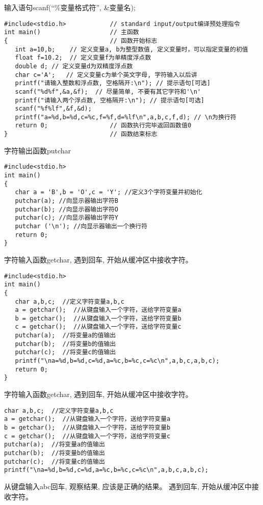 \begin{frame}[fragile]{输入语句scanf(``\%变量格式符'', \&变量名);}
\begin{lstlisting}
#include<stdio.h>            // standard input/output编译预处理指令
int main()                   // 主函数
{                            // 函数开始标志
   int a=10,b;    // 定义变量a, b为整型数值, 定义变量时，可以指定变量的初值
   float f=10.2;  // 定义变量f为单精度浮点数
   double d; // 定义变量d为双精度浮点数
   char c='A';   // 定义变量c为单个英文字母, 字符输入以后讲
   printf("请输入整数和浮点数, 空格隔开:\n"); // 提示语句[可选]
   scanf("%d%f",&a,&f);  // 尽量简单, 不要有其它字符和'\n'
   printf("请输入两个浮点数, 空格隔开:\n"); // 提示语句[可选]
   scanf("%f%lf",&f,&d);
   printf("a=%d,b=%d,c=%c,f=%f,d=%lf\n",a,b,c,f,d); // \n为换行符
   return 0;                 // 函数执行完毕返回函数值0
}                            // 函数结束标志
\end{lstlisting}
\end{frame}

\begin{frame}[fragile]{字符输出函数putchar}
\begin{lstlisting}
#include<stdio.h>
int main()
{
   char a = 'B',b = 'O',c = 'Y'; //定义3个字符变量并初始化
   putchar(a); //向显示器输出字符B
   putchar(b); //向显示器输出字符O
   putchar(c); //向显示器输出字符Y
   putchar ('\n'); //向显示器输出一个换行符
   return 0;
}
\end{lstlisting}
\end{frame}

\begin{frame}[fragile]{字符输入函数getchar, 遇到回车, 开始从缓冲区中接收字符。}
\vspace{-0.4cm}
\begin{lstlisting}
#include<stdio.h>
int main()
{
   char a,b,c;  //定义字符变量a,b,c
   a = getchar();  //从键盘输入一个字符，送给字符变量a
   b = getchar();  //从键盘输入一个字符，送给字符变量b
   c = getchar();  //从键盘输入一个字符，送给字符变量c
   putchar(a);  //将变量a的值输出
   putchar(b);  //将变量b的值输出 
   putchar(c);  //将变量c的值输出
   printf("\na=%d,b=%d,c=%d,a=%c,b=%c,c=%c\n",a,b,c,a,b,c);
   return 0;
}
\end{lstlisting}
\end{frame}

\begin{frame}[fragile]{字符输入函数getchar, 遇到回车, 开始从缓冲区中接收字符。}
\begin{lstlisting}
char a,b,c;  //定义字符变量a,b,c
a = getchar();  //从键盘输入一个字符，送给字符变量a
b = getchar();  //从键盘输入一个字符，送给字符变量b
c = getchar();  //从键盘输入一个字符，送给字符变量c
putchar(a);  //将变量a的值输出
putchar(b);  //将变量b的值输出 
putchar(c);  //将变量c的值输出
printf("\na=%d,b=%d,c=%d,a=%c,b=%c,c=%c\n",a,b,c,a,b,c);
\end{lstlisting}
从键盘输入abc回车, 观察结果, 应该是正确的结果。
遇到回车, 开始从缓冲区中接收字符。
\end{frame}

